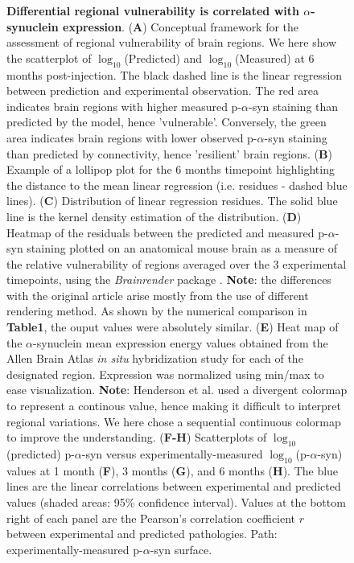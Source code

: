 \begin{figure}[!h]
    \caption{
      \textbf{Differential regional vulnerability is correlated with $\alpha$-synuclein expression}.
        (\textbf{A}) Conceptual framework for the assessment of regional vulnerability of brain regions. We here show the scatterplot of $\log_{10}$(Predicted) and  $\log_{10}$(Measured) at 6 months post-injection. The black dashed line is the linear regression between prediction and experimental observation. The red area indicates brain regions with higher measured p-$\alpha$-syn staining than predicted by the model, hence 'vulnerable'. Conversely, the green area indicates brain regions with lower observed p-$\alpha$-syn staining than predicted by connectivity, hence 'resilient' brain regions.
        (\textbf{B}) Example of a lollipop plot for the 6 months timepoint highlighting the distance to the mean linear regression (i.e. residues - dashed blue lines).
        (\textbf{C}) Distribution of linear regression residues. The solid blue line is the kernel density estimation of the distribution. 
        (\textbf{D}) Heatmap of the residuals between the predicted and measured p-$\alpha$-syn staining plotted on an anatomical mouse brain as a measure of the relative vulnerability of regions averaged over the 3 experimental timepoints, using the  \textit{Brainrender} package \cite{Claudi_2021}. \textbf{Note}: the differences with the original article arise mostly from the use of different rendering method. As shown by the numerical comparison in \textbf{Table1}, the ouput values were absolutely similar. 
        (\textbf{E}) Heat map of the $\alpha$-synuclein mean expression energy values obtained from the Allen Brain Atlas \textit{in situ} hybridization study for each of the designated region. Expression was normalized using min/max to ease visualization. \textbf{Note}: Henderson et al. used a divergent colormap to represent a continous value, hence making it difficult to interpret regional variations. We here chose a sequential continuous colormap to improve the understanding.
        (\textbf{F-H}) Scatterplots of $\log_{10}$(predicted) p-$\alpha$-syn versus experimentally-measured $\log_{10}$(p-$\alpha$-syn) values at 1 month (\textbf{F}), 3 months (\textbf{G}), and 6 months (\textbf{H}). The blue lines are the linear correlations between experimental and predicted values (shaded areas: 95\% confidence interval). Values at the bottom right of each panel are the Pearson's correlation coefficient $r$ between experimental and predicted pathologies. Path: experimentally-measured p-$\alpha$-syn surface.}

\end{figure}


